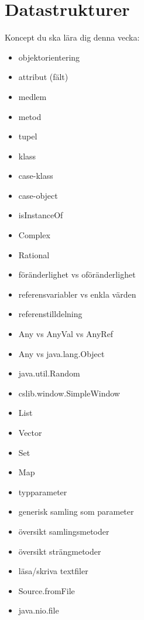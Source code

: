 \chapter{Datastrukturer}\label{chapter:W04}
Koncept du ska lära dig denna vecka:
\begin{multicols}{2}\begin{itemize}[nosep,label={$\square$},leftmargin=*]
\item objektorientering
\item attribut (fält)
\item medlem
\item metod
\item tupel
\item klass
\item case-klass
\item case-object
\item isInstanceOf
\item Complex
\item Rational
\item föränderlighet vs oföränderlighet
\item referensvariabler vs enkla värden
\item referenstilldelning
\item Any vs AnyVal vs AnyRef
\item Any vs java.lang.Object
\item java.util.Random
\item cslib.window.SimpleWindow
\item List
\item Vector
\item Set
\item Map
\item typparameter
\item generisk samling som parameter
\item översikt samlingsmetoder
\item översikt strängmetoder
\item läsa/skriva textfiler
\item Source.fromFile
\item java.nio.file\end{itemize}\end{multicols}
